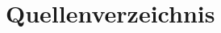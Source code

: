%
\section{Quellenverzeichnis}
\label{sec:quellenverzeichnis}

\begingroup
\makeatletter
\renewcommand{\chapter}{\@ifstar\@gobble\@gobble}
\makeatother


\endgroup
